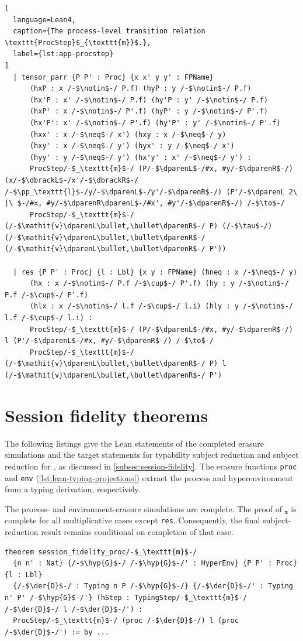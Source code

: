 \begin{lstlisting}[
  language=Lean4,
  caption={The process-level transition relation \texttt{ProcStep}$_{\texttt{m}}$.},
  label={lst:app-procstep}
]
  | tensor_parr {P P' : Proc} {x x' y y' : FPName}
      (hxP : x /-$\notin$-/ P.f) (hyP : y /-$\notin$-/ P.f)
      (hx'P : x' /-$\notin$-/ P.f) (hy'P : y' /-$\notin$-/ P.f)
      (hxP' : x /-$\notin$-/ P'.f) (hyP' : y /-$\notin$-/ P'.f)
      (hx'P': x' /-$\notin$-/ P'.f) (hy'P' : y' /-$\notin$-/ P'.f)
      (hxx' : x /-$\neq$-/ x') (hxy : x /-$\neq$-/ y)
      (hxy' : x /-$\neq$-/ y') (hyx' : y /-$\neq$-/ x')
      (hyy' : y /-$\neq$-/ y') (hx'y' : x' /-$\neq$-/ y') :
      ProcStep/-$_\texttt{m}$-/ (P/-$\dparenL$-/#x, #y/-$\dparenR$-/) (x/-$\dbrackL$-/x'/-$\dbrackR$-/ /-$\pp_\texttt{l}$-/y/-$\dparenL$-/y'/-$\dparenR$-/) (P'/-$\dparenL 2\ |\ $-/#x, #y/-$\dparenR\dparenL$-/#x', #y'/-$\dparenR$-/) /-$\to$-/
      ProcStep/-$_\texttt{m}$-/ (/-$\mathit{v}\dparenL\bullet,\bullet\dparenR$-/ P) (/-$\tau$-/) (/-$\mathit{v}\dparenL\bullet,\bullet\dparenR$-/ (/-$\mathit{v}\dparenL\bullet,\bullet\dparenR$-/ P'))

  | res {P P' : Proc} {l : Lbl} {x y : FPName} (hneq : x /-$\neq$-/ y)
      (hx : x /-$\notin$-/ P.f /-$\cup$-/ P'.f) (hy : y /-$\notin$-/ P.f /-$\cup$-/ P'.f)
      (hlx : x /-$\notin$-/ l.f /-$\cup$-/ l.i) (hly : y /-$\notin$-/ l.f /-$\cup$-/ l.i) :
      ProcStep/-$_\texttt{m}$-/ (P/-$\dparenL$-/#x, #y/-$\dparenR$-/) l (P'/-$\dparenL$-/#x, #y/-$\dparenR$-/) /-$\to$-/ 
      ProcStep/-$_\texttt{m}$-/ (/-$\mathit{v}\dparenL\bullet,\bullet\dparenR$-/ P) l (/-$\mathit{v}\dparenL\bullet,\bullet\dparenR$-/ P')
\end{lstlisting}

\section{Session fidelity theorems}\label{app:session-fidelity}
The following listings give the Lean statements of the completed erasure simulations and the target statements for typability subject reduction and subject reduction for \pimll{}, as discussed in \cref{subsec:session-fidelity}. The erasure functions \texttt{proc} and \texttt{env} (\cref{lst:lean-typing-projections}) extract the process and hyperenvironment from a typing derivation, respectively.

The process- and environment-erasure simulations are complete. The proof of $_{\texttt{m}}$ is complete for all multiplicative cases except \texttt{res}. Consequently, the final subject-reduction result remains conditional on completion of that case.

\begin{lstlisting}[language=Lean4,
  caption={Process erasure simulation: typed derivation steps project to process steps.},
  label={lst:app-sf-proc}]
theorem session_fidelity_proc/-$_\texttt{m}$-/
  {n n' : Nat} {/-$\hyp{G}$-/ /-$\hyp{G}$-/' : HyperEnv} {P P' : Proc} {l : Lbl}
  {/-$\der{D}$-/ : Typing n P /-$\hyp{G}$-/} {/-$\der{D}$-/' : Typing n' P' /-$\hyp{G}$-/'} (hStep : TypingStep/-$_\texttt{m}$-/ /-$\der{D}$-/ l /-$\der{D}$-/') :
  ProcStep/-$_\texttt{m}$-/ (proc /-$\der{D}$-/) l (proc /-$\der{D}$-/') := by ...
\end{lstlisting}

